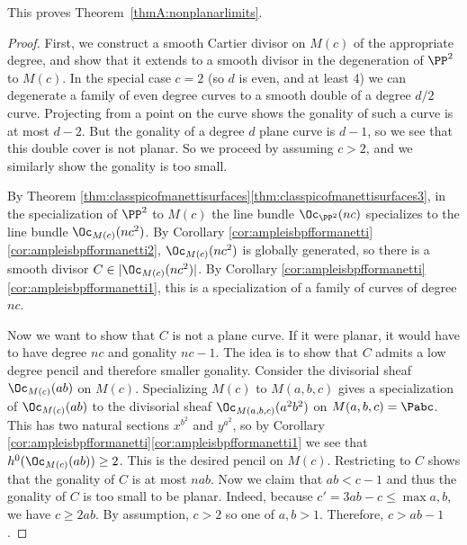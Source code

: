 \begin{remark}
This proves Theorem~\ref{thmA:nonplanarlimits}.
\end{remark}

\begin{proof}
First, we construct a smooth Cartier divisor on $M(c)$ of the appropriate degree, and show that it extends to a smooth divisor in the degeneration of $\PP^2$ to $M(c)$. In the special case $c=2$ (so $d$ is even, and at least 4) we can degenerate a family of even degree curves to a smooth double of a degree $d/2$ curve. Projecting from a point on the curve shows the gonality of such a curve is at most $d-2$. But the gonality of a degree $d$ plane curve is $d-1$, so we see that this double cover is not planar. So we proceed by assuming $c>2$, and we similarly show the gonality is too small.

By Theorem \ref{thm:classpicofmanettisurfaces}\eqref{thm:classpicofmanettisurfaces3}, in the specialization of $\PP^2$ to $M(c)$ the line bundle $\Oc_{\PP^2}(nc)$ specializes to the line bundle $\Oc_{M(c)}(nc^2)$. By Corollary \ref{cor:ampleisbpfformanetti}\eqref{cor:ampleisbpfformanetti2}, $\Oc_{M(c)}(nc^2)$ is globally generated, so there is a smooth divisor $C\in |\Oc_{M(c)}(nc^2)|$. By Corollary \ref{cor:ampleisbpfformanetti}\eqref{cor:ampleisbpfformanetti1}, this is a specialization of a family of curves of degree $nc$.

Now we want to show that $C$ is not a plane curve. If it were planar, it would have to have degree $nc$ and gonality $nc-1$. The idea is to show that $C$ admits a low degree pencil and therefore smaller gonality. Consider the divisorial sheaf $\Oc_{M(c)}(ab)$ on $M(c)$. Specializing $M(c)$ to $M(a,b,c)$ gives a specialization of $\Oc_{M(c)}(ab)$ to the divisorial sheaf $\Oc_{M(a,b,c)}(a^2b^2)$ on $M(a,b,c)=\Pabc$. This has two natural sections $x^{b^2}$ and $y^{a^2}$, so by Corollary \ref{cor:ampleisbpfformanetti}\eqref{cor:ampleisbpfformanetti1} we see that $h^0(\Oc_{M(c)}(ab))\ge 2$. This is the desired pencil on $M(c)$. Restricting to $C$ shows that the gonality of $C$ is at most $nab$. Now we claim that $ab< c-1$ and thus the gonality of $C$ is too small to be planar. Indeed, because $c' = 3ab - c \le \max{a,b}$, we have $c \ge 2ab$. By assumption, $c > 2$ so one of $a,b > 1$. Therefore, $c > ab -1$.
\end{proof}
